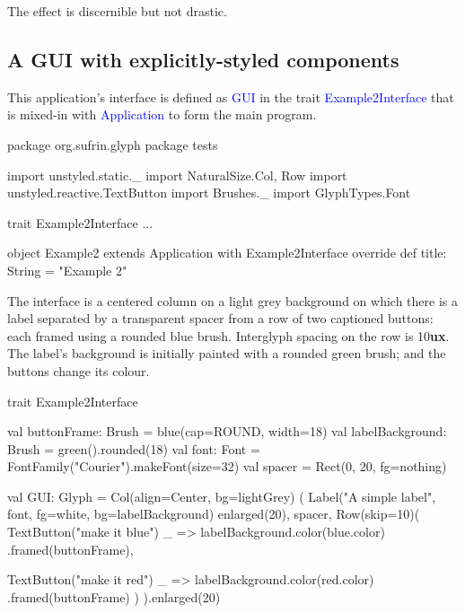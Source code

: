\documentclass[12pt,a4paper]{article}
\def\ux{\textbf{ux}\xspace}
\def\Scala#1{\textcolor{blue}{\textsf{#1}}}
\def\SS#1{\subsection{#1}}
\begin{document}
\pagebreak[4]
The effect is discernible but not drastic.
\begin{center}
\quad
{}
\end{center}

\SS{A GUI with explicitly-styled components}

This application's interface is defined as \Scala{GUI} 
in the trait \Scala{Example2Interface} that is mixed-in with
\Scala{Application} to form the main program.

\begin{scala}
package org.sufrin.glyph
package tests

import unstyled.static._
import NaturalSize.{Col, Row}
import unstyled.reactive.TextButton
import Brushes._
import GlyphTypes.Font
\end{scala}

\begin{scala}
trait Example2Interface { ... }

object Example2 extends Application  with Example2Interface {
  override def title: String = "Example 2"
}
\end{scala}

\begin{center}
\end{center}

The interface is a centered column on a light grey background on
which there is a label separated by a transparent spacer
from a row of two captioned buttons: each framed using a
rounded blue brush. Interglyph spacing on the row is
10\ux.  The label's background is initially painted with
a rounded green brush; and the buttons
change its colour.

\begin{scala}
trait Example2Interface {
  val buttonFrame: Brush =
        blue(cap=ROUND, width=18)
  val labelBackground: Brush =
        green().rounded(18)
  val font: Font  =
        FontFamily("Courier").makeFont(size=32)
  val spacer =
      Rect(0, 20, fg=nothing)

  val GUI: Glyph = Col(align=Center, bg=lightGrey) (
    Label("A simple label", font,
          fg=white,
          bg=labelBackground) enlarged(20),
    spacer,
    Row(skip=10)(
        TextButton("make it blue")
           { _ => labelBackground.color(blue.color) }
           .framed(buttonFrame),
           
        TextButton("make it red")
           { _ => labelBackground.color(red.color) }
           .framed(buttonFrame)
    )
  ).enlarged(20)
}
\end{scala}
\end{document}

